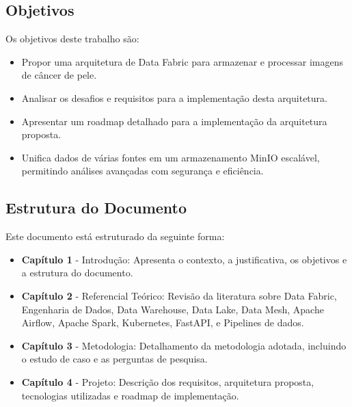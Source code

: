 \subsection{Objetivos}

Os objetivos deste trabalho são:
\begin{itemize}
    \item Propor uma arquitetura de Data Fabric para armazenar e processar imagens de câncer de pele.
    \item Analisar os desafios e requisitos para a implementação desta arquitetura.
    \item Apresentar um roadmap detalhado para a implementação da arquitetura proposta.
    \item Unifica dados de várias fontes em um armazenamento MinIO escalável, permitindo análises avançadas com segurança e eficiência.
\end{itemize}

\subsection{Estrutura do Documento}

Este documento está estruturado da seguinte forma:
\begin{itemize}
    \item \textbf{Capítulo 1} - Introdução: Apresenta o contexto, a justificativa, os objetivos e a estrutura do documento.
    \item \textbf{Capítulo 2} - Referencial Teórico: Revisão da literatura sobre Data Fabric, Engenharia de Dados, Data Warehouse, Data Lake, Data Mesh, Apache Airflow, Apache Spark, Kubernetes, FastAPI, e Pipelines de dados.
    \item \textbf{Capítulo 3} - Metodologia: Detalhamento da metodologia adotada, incluindo o estudo de caso e as perguntas de pesquisa.
    \item \textbf{Capítulo 4} - Projeto: Descrição dos requisitos, arquitetura proposta, tecnologias utilizadas e roadmap de implementação.
\end{itemize}